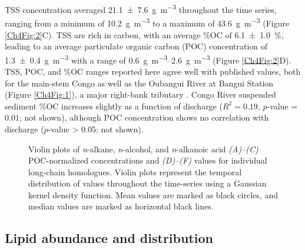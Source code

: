 TSS concentration averaged \SI{21.1 \pm 7.6}{g.m^{-3}} throughout the time series, ranging from a minimum of \SI{10.2}{g.m^{-3}} to a maximum of \SI{43.6}{g.m^{-3}} (Figure \ref{Ch4Fig:2}C). TSS are rich in carbon, with an average \%OC of \SI{6.1 \pm 1.0}{\%}, leading to an average particulate organic carbon (POC) concentration of \SI{1.3 \pm 0.4}{g.m^{-3}} with a range of \SIrange{0.6}{2.6}{g.m^{-3}} (Figure \ref{Ch4Fig:2}D). TSS, POC, and \%OC ranges reported here agree well with published values, both for the main-stem Congo as well as the Oubangui River at Bangui Station (Figure \ref{Ch4Fig:1}), a major right-bank tributary \citep{Coynel:2005cn,Bouillon:2012cw,Bouillon:2014ko}. Congo River suspended sediment \%OC increases slightly as a function of discharge ($R^2 = 0.19$, $p$-value = $0.01$; not shown), although POC concentration shows no correlation with discharge ($p$-value > $0.05$; not shown). 

\begin{figure}[t]
	\caption[Concentration and  violin plots]{Violin plots of \textit{n}-alkane, \textit{n}-alcohol, and \textit{n}-alkanoic acid \textit{(A)--(C)} POC-normalized concentrations and \textit{(D)--(F)}  values for individual long-chain homologues. Violin plots represent the temporal distribution of values throughout the time-series using a Gaussian kernel density function. Mean values are marked as black circles, and median values are marked as horizontal black lines.}
	\label{Ch4Fig:3} 
\end{figure}

\subsection{Lipid abundance and distribution}

